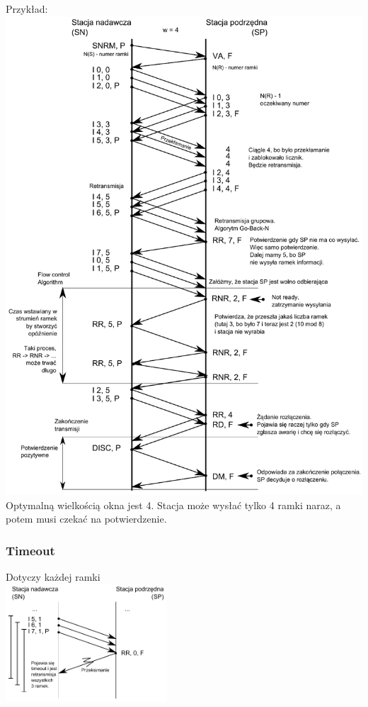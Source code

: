			Przykład:\\
			\includegraphics[width=14cm]{./images/image14.pdf}\\
			Optymalną wielkością okna jest 4. Stacja może wysłać tylko 4 ramki naraz, a potem musi czekać na potwierdzenie.
			\subsubsection{Timeout}
				Dotyczy każdej ramki\\
				\includegraphics[width=6cm]{./images/image15.pdf}
